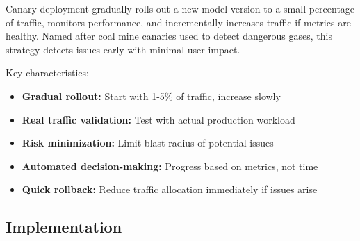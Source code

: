 Canary deployment gradually rolls out a new model version to a small percentage of traffic, monitors performance, and incrementally increases traffic if metrics are healthy. Named after coal mine canaries used to detect dangerous gases, this strategy detects issues early with minimal user impact.

Key characteristics:
\begin{itemize}
    \item \textbf{Gradual rollout:} Start with 1-5\% of traffic, increase slowly
    \item \textbf{Real traffic validation:} Test with actual production workload
    \item \textbf{Risk minimization:} Limit blast radius of potential issues
    \item \textbf{Automated decision-making:} Progress based on metrics, not time
    \item \textbf{Quick rollback:} Reduce traffic allocation immediately if issues arise
\end{itemize}

\subsection{Implementation}


